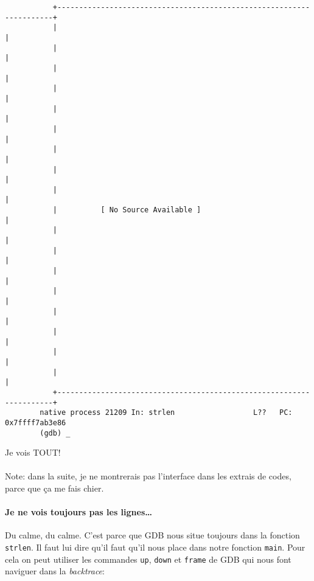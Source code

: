 \begin{listing}[H]
	\begin{verbatim}
		   +---------------------------------------------------------------------+
		   |                                                                     |
		   |                                                                     |
		   |                                                                     |
		   |                                                                     |
		   |                                                                     |
		   |                                                                     |
		   |                                                                     |
		   |                                                                     |
		   |                                                                     |
		   |          [ No Source Available ]                                    |
		   |                                                                     |
		   |                                                                     |
		   |                                                                     |
		   |                                                                     |
		   |                                                                     |
		   |                                                                     |
		   |                                                                     |
		   |                                                                     |
		   +---------------------------------------------------------------------+
		native process 21209 In: strlen                  L??   PC: 0x7ffff7ab3e86
		(gdb) _
	\end{verbatim}
	\caption{Je vois TOUT!}
\end{listing}

\paragraph{} Note: dans la suite, je ne montrerais pas l'interface dans les
extrais de codes, parce que ça me fais chier.

\paragraph{Je ne vois toujours pas les lignes\ldots} Du calme, du calme. C'est
parce que GDB nous situe toujours dans la fonction \texttt{strlen}. Il
faut lui dire qu'il faut qu'il nous place dans notre fonction
\texttt{main}.  Pour cela on peut utiliser les commandes \texttt{up},
\texttt{down} et \texttt{frame} de GDB qui nous font naviguer dans la
\textit{backtrace}:

